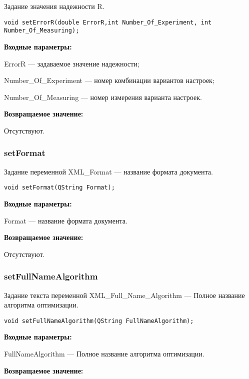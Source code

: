 \documentclass[a4paper,12pt]{article}
\begin{document}
Задание значения надежности R.


\begin{lstlisting}[label=code_syntax_setErrorR,caption=Синтаксис]
void setErrorR(double ErrorR,int Number_Of_Experiment, int Number_Of_Measuring);
\end{lstlisting}

\textbf{Входные параметры:}

ErrorR --- задаваемое значение надежности;

Number\_Of\_Experiment --- номер комбинации вариантов настроек;

Number\_Of\_Measuring --- номер измерения варианта настроек.

\textbf{Возвращаемое значение:}

Отсутствуют.


\subsubsection{setFormat}\label{setFormat}

Задание переменной XML\_Format --- название формата документа.


\begin{lstlisting}[label=code_syntax_setFormat,caption=Синтаксис]
void setFormat(QString Format);
\end{lstlisting}

\textbf{Входные параметры:}

Format --- название формата документа.

\textbf{Возвращаемое значение:}

Отсутствуют.


\subsubsection{setFullNameAlgorithm}\label{setFullNameAlgorithm}

Задание текста переменной  XML\_Full\_Name\_Algorithm --- Полное название алгоритма оптимизации.


\begin{lstlisting}[label=code_syntax_setFullNameAlgorithm,caption=Синтаксис]
void setFullNameAlgorithm(QString FullNameAlgorithm);
\end{lstlisting}

\textbf{Входные параметры:}

FullNameAlgorithm --- Полное название алгоритма оптимизации.

\textbf{Возвращаемое значение:}
\end{document}
